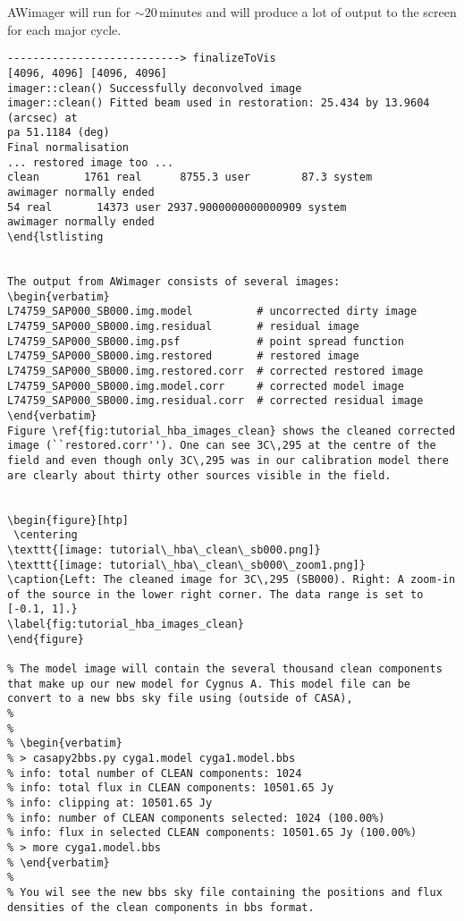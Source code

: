 AWimager will run for $\sim20$\,minutes and will produce a lot of output to the screen for each major cycle.
\begin{lstlisting}
---------------------------> finalizeToVis
[4096, 4096] [4096, 4096]
imager::clean() Successfully deconvolved image
imager::clean() Fitted beam used in restoration: 25.434 by 13.9604 (arcsec) at 
pa 51.1184 (deg)
Final normalisation
... restored image too ...
clean       1761 real      8755.3 user        87.3 system
awimager normally ended
54 real       14373 user 2937.9000000000000909 system
awimager normally ended
\end{lstlisting


The output from AWimager consists of several images:
\begin{verbatim}
L74759_SAP000_SB000.img.model          # uncorrected dirty image
L74759_SAP000_SB000.img.residual       # residual image
L74759_SAP000_SB000.img.psf            # point spread function
L74759_SAP000_SB000.img.restored       # restored image
L74759_SAP000_SB000.img.restored.corr  # corrected restored image
L74759_SAP000_SB000.img.model.corr     # corrected model image
L74759_SAP000_SB000.img.residual.corr  # corrected residual image
\end{verbatim}
Figure \ref{fig:tutorial_hba_images_clean} shows the cleaned corrected image (``restored.corr''). One can see 3C\,295 at the centre of the field and even though only 3C\,295 was in our calibration model there are clearly about thirty other sources visible in the field.


\begin{figure}[htp]
 \centering
\texttt{[image: tutorial\_hba\_clean\_sb000.png]}
\texttt{[image: tutorial\_hba\_clean\_sb000\_zoom1.png]}
\caption{Left: The cleaned image for 3C\,295 (SB000). Right: A zoom-in of the source in the lower right corner. The data range is set to [-0.1, 1].}
\label{fig:tutorial_hba_images_clean}
\end{figure}

% The model image will contain the several thousand clean components that make up our new model for Cygnus A. This model file can be convert to a new bbs sky file using (outside of CASA),
% 
% 
% \begin{verbatim}
% > casapy2bbs.py cyga1.model cyga1.model.bbs
% info: total number of CLEAN components: 1024
% info: total flux in CLEAN components: 10501.65 Jy
% info: clipping at: 10501.65 Jy
% info: number of CLEAN components selected: 1024 (100.00%)
% info: flux in selected CLEAN components: 10501.65 Jy (100.00%)
% > more cyga1.model.bbs
% \end{verbatim}
% 
% You wil see the new bbs sky file containing the positions and flux densities of the clean components in bbs format.


\end{lstlisting}
